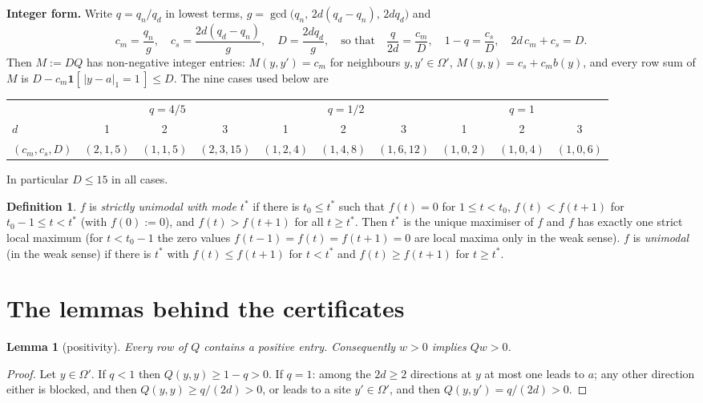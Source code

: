 \documentclass[11pt,a4paper]{article}
\newtheorem{lemma}[theorem]{Lemma}
\theoremstyle{definition}
\newtheorem{definition}[theorem]{Definition}
\theoremstyle{remark}
\begin{document}
\textbf{Integer form.} Write $q=q_n/q_d$ in lowest terms, $g=\gcd\bigl(q_n,\,2d(q_d-q_n),\,2dq_d\bigr)$ and
\[
c_m=\frac{q_n}{g},\quad c_s=\frac{2d(q_d-q_n)}{g},\quad D=\frac{2dq_d}{g},\quad\text{so that}\quad \frac{q}{2d}=\frac{c_m}{D},\quad 1-q=\frac{c_s}{D},\quad 2d\,c_m+c_s=D .
\]
Then $M:=DQ$ has non-negative integer entries: $M(y,y')=c_m$ for neighbours $y,y'\in\Omega'$, $M(y,y)=c_s+c_mb(y)$, and every row sum of $M$ is $D-c_m\mathbf 1[\,|y-a|_1=1\,]\le D$. The nine cases used below are
\begin{center}\small
\begin{tabular}{l|ccc|ccc|ccc}
 & \multicolumn{3}{c|}{$q=4/5$} & \multicolumn{3}{c|}{$q=1/2$} & \multicolumn{3}{c}{$q=1$}\\
$d$ & 1 & 2 & 3 & 1 & 2 & 3 & 1 & 2 & 3\\ \hline
$(c_m,c_s,D)$ & $(2,1,5)$ & $(1,1,5)$ & $(2,3,15)$ & $(1,2,4)$ & $(1,4,8)$ & $(1,6,12)$ & $(1,0,2)$ & $(1,0,4)$ & $(1,0,6)$
\end{tabular}
\end{center}
In particular $D\le15$ in all cases.

\begin{definition}\label{def:unimodal}
$f$ is \emph{strictly unimodal with mode $t^*$} if there is $t_0\le t^*$ such that $f(t)=0$ for $1\le t<t_0$, $f(t)<f(t+1)$ for $t_0-1\le t<t^*$ (with $f(0):=0$), and $f(t)>f(t+1)$ for all $t\ge t^*$. Then $t^*$ is the unique maximiser of $f$ and $f$ has exactly one strict local maximum (for $t<t_0-1$ the zero values $f(t-1)=f(t)=f(t+1)=0$ are local maxima only in the weak sense). $f$ is \emph{unimodal} (in the weak sense) if there is $t^*$ with $f(t)\le f(t+1)$ for $t<t^*$ and $f(t)\ge f(t+1)$ for $t\ge t^*$.
\end{definition}

\section{The lemmas behind the certificates}\label{sec:lemmas}

\begin{lemma}[positivity]\label{lem:pos}
Every row of $Q$ contains a positive entry. Consequently $w>0$ implies $Qw>0$.
\end{lemma}
\begin{proof}
Let $y\in\Omega'$. If $q<1$ then $Q(y,y)\ge1-q>0$. If $q=1$: among the $2d\ge2$ directions at $y$ at most one leads to $a$; any other direction either is blocked, and then $Q(y,y)\ge q/(2d)>0$, or leads to a site $y'\in\Omega'$, and then $Q(y,y')=q/(2d)>0$.
\end{proof}
\end{document}
